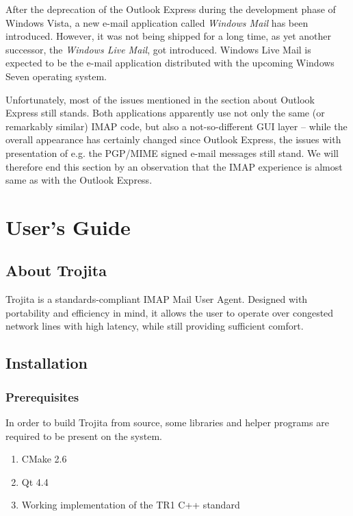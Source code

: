 \documentclass[12pt,notitlepage]{report}
\newcommand{\trojita}{Trojita\xspace}
\begin{document}
After the deprecation of the Outlook Express during the development phase of
Windows Vista, a new e-mail application called {\em Windows Mail} has been
introduced.  However, it was not being shipped for a long time, as yet another
successor, the {\em Windows Live Mail}, got introduced.  Windows Live Mail is
expected to be the e-mail application distributed with the upcoming Windows
Seven operating system.

Unfortunately, most of the issues mentioned in the section about Outlook Express
still stands.  Both applications apparently use not only the same (or remarkably
similar) IMAP code, but also a not-so-different GUI layer -- while the overall
appearance has certainly changed since Outlook Express, the issues with
presentation of e.g. the PGP/MIME signed e-mail messages still stand.  We will
therefore end this section by an observation that the IMAP experience is almost
same as with the Outlook Express.

\chapter{User's Guide}
\label{users-guide}

\section{About Trojita}

\trojita is a standards-compliant IMAP Mail User Agent. Designed with portability
and efficiency in mind, it allows the user to operate over congested network
lines with high latency, while still providing sufficient comfort.

\section{Installation}

\subsection{Prerequisites}

In order to build \trojita from source, some libraries and helper programs are
required to be present on the system.

\begin{enumerate}
    \item{CMake 2.6}
    \item{Qt 4.4}
    \item{Working implementation of the TR1 C++ standard}
\end{enumerate}
\end{document}
